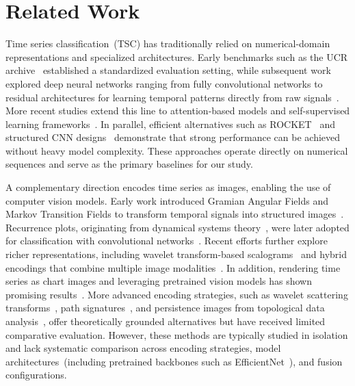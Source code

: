 
\section{Related Work}
\label{sec:related}

Time series classification~(TSC) has traditionally relied on
numerical-domain representations and specialized architectures.
Early benchmarks such as the UCR archive~\cite{dau2019ucr} established a
standardized evaluation setting, while subsequent work explored deep neural
networks ranging from fully convolutional networks to residual architectures
for learning temporal patterns directly from raw
signals~\cite{fawaz2019deep}.
More recent studies extend this line to attention-based models and
self-supervised learning frameworks~\cite{foumani2024survey}.
In parallel, efficient alternatives such as ROCKET~\cite{dempster2020rocket}
and structured CNN designs~\cite{tang2022oscnn} demonstrate that strong
performance can be achieved without heavy model complexity.
These approaches operate directly on numerical sequences and serve as the
primary baselines for our study.

A complementary direction encodes time series as images, enabling the use of
computer vision models.
Early work introduced Gramian Angular Fields and Markov Transition Fields to
transform temporal signals into structured
images~\cite{wang2015imaging}.
Recurrence plots, originating from dynamical systems
theory~\cite{eckmann1987recurrence}, were later adopted for classification
with convolutional networks~\cite{hatami2018classification}.
Recent efforts further explore richer representations, including wavelet
transform-based scalograms~\cite{zhao2024cwt3dcnn} and hybrid encodings that
combine multiple image modalities~\cite{mariani2024fusion}.
In addition, rendering time series as chart images and leveraging pretrained
vision models has shown promising results~\cite{li2023vitst}.
More advanced encoding strategies, such as wavelet scattering
transforms~\cite{anden2014scattering}, path
signatures~\cite{kidger2021signatory}, and persistence images from
topological data analysis~\cite{seversky2016tda, umeda2017tda}, offer
theoretically grounded alternatives but have received limited comparative
evaluation.
However, these methods are typically studied in isolation and lack systematic
comparison across encoding strategies, model architectures~(including
pretrained backbones such as
EfficientNet~\cite{tan2019efficientnet}), and fusion configurations.

